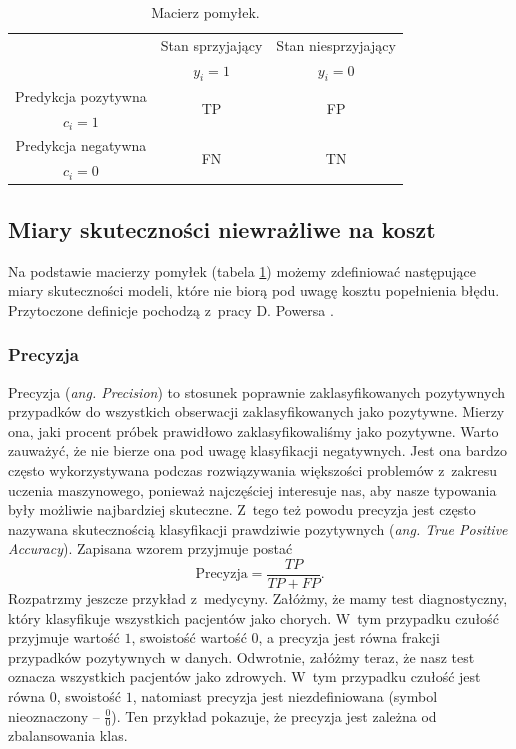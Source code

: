 \documentclass[inzynierska]{pwr_wmat_praca_dyplomowa}
\theoremstyle{plain}
\numberwithin{theorem}{chapter}
\theoremstyle{definition}
\numberwithin{theorem}{chapter}
\begin{document}
\begin{table}[h]
	\begin{center}
		\begin{tabular}{c|c|c}
			 \multirow{2}{8em}{} & Stan sprzyjający & Stan niesprzyjający \\
			                  & $y_i = 1$            & $y_i = 0$ \\
			 \hline
			  Predykcja pozytywna & \multirow{2}{8em}{\centering TP}& \multirow{2}{8em}{\centering FP} \\
			    $c_i = 1$ &  &                 \\
			 \hline
			 Predykcja negatywna & \multirow{2}{8em}{\centering FN} & \multirow{2}{8em}{\centering TN} \\
			   $c_i = 0$ &  &  \\
		\end{tabular}
	\end{center}
	\caption{Macierz pomyłek.}
	\label{tab:macierz-pomylek}
\end{table}

\subsection{Miary skuteczności niewrażliwe na koszt}
Na podstawie macierzy pomyłek (tabela \ref{tab:macierz-pomylek}) możemy zdefiniować następujące miary skuteczności modeli, które nie biorą pod uwagę kosztu popełnienia błędu. Przytoczone definicje pochodzą z~pracy D. Powersa \cite{evaluation_metrics}.

\subsubsection{Precyzja}
Precyzja (\textit{ang. Precision}) to stosunek poprawnie zaklasyfikowanych pozytywnych przypadków do wszystkich obserwacji zaklasyfikowanych jako pozytywne. Mierzy ona, jaki procent próbek prawidłowo zaklasyfikowaliśmy jako pozytywne. Warto zauważyć, że nie bierze ona pod uwagę klasyfikacji negatywnych. Jest ona bardzo często wykorzystywana podczas rozwiązywania większości problemów z~zakresu uczenia maszynowego, ponieważ najczęściej interesuje nas, aby nasze typowania były możliwie najbardziej skuteczne. Z~tego też powodu precyzja jest często nazywana skutecznością klasyfikacji prawdziwie pozytywnych (\textit{ang. True Positive Accuracy}). Zapisana wzorem przyjmuje postać
$$ \text{Precyzja} = \frac{TP}{TP + FP} \text{.}$$
Rozpatrzmy jeszcze przykład z~medycyny. Załóżmy, że mamy test diagnostyczny, który klasyfikuje wszystkich pacjentów jako chorych. W~tym przypadku czułość przyjmuje wartość $1$, swoistość wartość $0$, a precyzja jest równa frakcji przypadków pozytywnych w danych. Odwrotnie, załóżmy teraz, że nasz test oznacza wszystkich pacjentów jako zdrowych. W~tym przypadku czułość jest równa $0$, swoistość $1$, natomiast precyzja jest niezdefiniowana (symbol nieoznaczony -- $\frac{0}{0}$). Ten przykład pokazuje, że precyzja jest zależna od zbalansowania klas.
\end{document}
